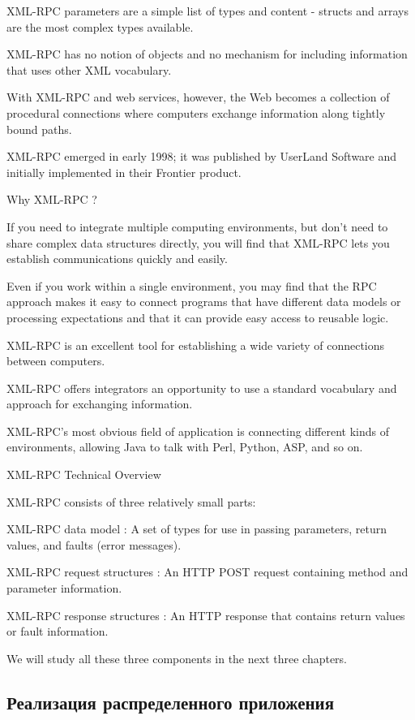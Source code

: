 \documentclass[a4paper,openany,twoside,draft]{book}
\begin{document}
    XML-RPC parameters are a simple list of types and content - structs and arrays are the most complex types available.

    XML-RPC has no notion of objects and no mechanism for including information that uses other XML vocabulary.

    With XML-RPC and web services, however, the Web becomes a collection of procedural connections where computers exchange information along tightly bound paths.

    XML-RPC emerged in early 1998; it was published by UserLand Software and initially implemented in their Frontier product.

Why XML-RPC ?

If you need to integrate multiple computing environments, but don't need to share complex data structures directly, you will find that XML-RPC lets you establish communications quickly and easily.

Even if you work within a single environment, you may find that the RPC approach makes it easy to connect programs that have different data models or processing expectations and that it can provide easy access to reusable logic.

    XML-RPC is an excellent tool for establishing a wide variety of connections between computers.

    XML-RPC offers integrators an opportunity to use a standard vocabulary and approach for exchanging information.

    XML-RPC's most obvious field of application is connecting different kinds of environments, allowing Java to talk with Perl, Python, ASP, and so on.

XML-RPC Technical Overview

XML-RPC consists of three relatively small parts:

    XML-RPC data model : A set of types for use in passing parameters, return values, and faults (error messages).

    XML-RPC request structures : An HTTP POST request containing method and parameter information.

    XML-RPC response structures : An HTTP response that contains return values or fault information.

We will study all these three components in the next three chapters.

\newpage
\subsection{Реализация распределенного приложения}
\label{sec:distrimpl}
\end{document}
